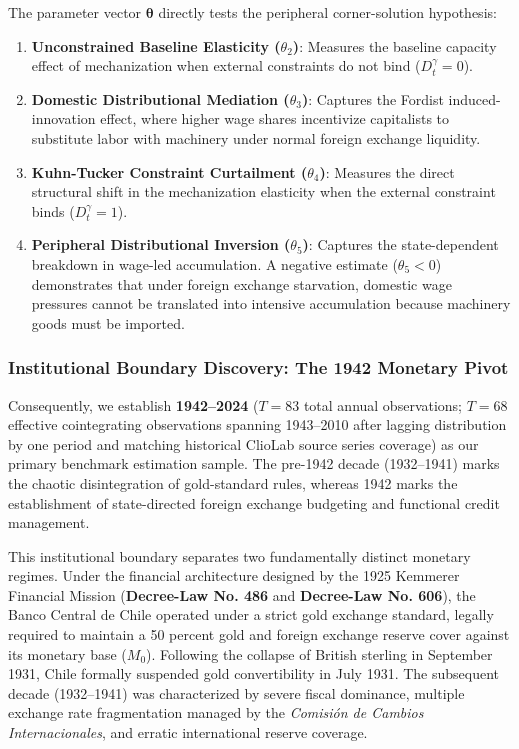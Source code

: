 The parameter vector $\boldsymbol{\theta}$ directly tests the peripheral corner-solution hypothesis:
\begin{enumerate}
    \item \textbf{Unconstrained Baseline Elasticity ($\theta_2$)}: Measures the baseline capacity effect of mechanization when external constraints do not bind ($D_t^{\gamma} = 0$).
    \item \textbf{Domestic Distributional Mediation ($\theta_3$)}: Captures the Fordist induced-innovation effect, where higher wage shares incentivize capitalists to substitute labor with machinery under normal foreign exchange liquidity.
    \item \textbf{Kuhn-Tucker Constraint Curtailment ($\theta_4$)}: Measures the direct structural shift in the mechanization elasticity when the external constraint binds ($D_t^{\gamma} = 1$).
    \item \textbf{Peripheral Distributional Inversion ($\theta_5$)}: Captures the state-dependent breakdown in wage-led accumulation. A negative estimate ($\theta_5 < 0$) demonstrates that under foreign exchange starvation, domestic wage pressures cannot be translated into intensive accumulation because machinery goods must be imported.
\end{enumerate}

\subsubsection{Institutional Boundary Discovery: The 1942 Monetary Pivot}

Consequently, we establish \textbf{1942--2024} ($T = 83$ total annual observations; $T = 68$ effective cointegrating observations spanning 1943--2010 after lagging distribution by one period and matching historical ClioLab source series coverage) as our primary benchmark estimation sample. The pre-1942 decade (1932--1941) marks the chaotic disintegration of gold-standard rules, whereas 1942 marks the establishment of state-directed foreign exchange budgeting and functional credit management.

This institutional boundary separates two fundamentally distinct monetary regimes. Under the financial architecture designed by the 1925 Kemmerer Financial Mission (\textbf{Decree-Law No. 486} and \textbf{Decree-Law No. 606}), the Banco Central de Chile operated under a strict gold exchange standard, legally required to maintain a 50 percent gold and foreign exchange reserve cover against its monetary base ($M_0$). Following the collapse of British sterling in September 1931, Chile formally suspended gold convertibility in July 1931. The subsequent decade (1932--1941) was characterized by severe fiscal dominance, multiple exchange rate fragmentation managed by the \textit{Comisión de Cambios Internacionales}, and erratic international reserve coverage.

